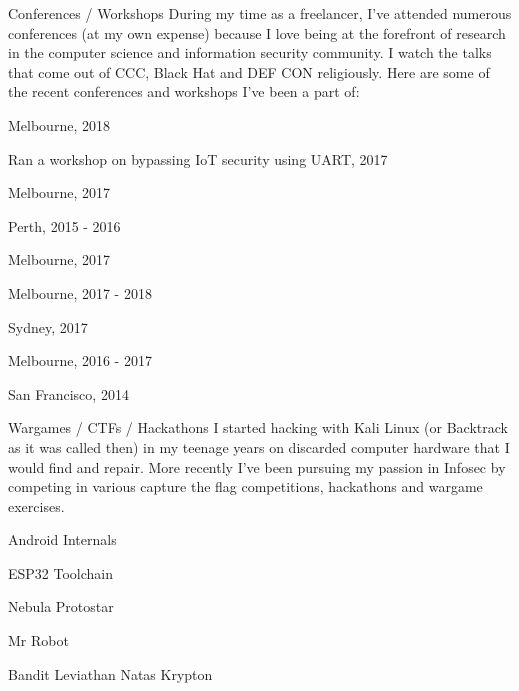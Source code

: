 \begin{cventries}
    \cventrysimple
        {Conferences / Workshops}
        {
            During my time as a freelancer, I've attended numerous conferences (at my own expense) because I love being at the forefront of research in the computer science and information security community. I watch the talks that come out of CCC, Black Hat and DEF CON religiously. Here are some of the recent conferences and workshops I've been a part of:
        }
        {
            \begin{cvitems}
                \item { \acvSubItemSep Melbourne, 2018}
                \item { \acvSubItemSep Ran a workshop on bypassing IoT security using UART, 2017}
                \item { \acvSubItemSep Melbourne, 2017}
                \item { \acvSubItemSep Perth, 2015 - 2016}
                \item { \acvSubItemSep Melbourne, 2017}
                \item { \acvSubItemSep Melbourne, 2017 - 2018}
                \item { \acvSubItemSep Sydney, 2017}
                \item { \acvSubItemSep Melbourne, 2016 - 2017}
                \item { \acvSubItemSep San Francisco, 2014}
            \end{cvitems}
        }


    \cventrysimple
        {Wargames / CTFs / Hackathons}
        {
            I started hacking with Kali Linux (or Backtrack as it was called then) in my teenage years on discarded computer hardware that I would find and repair. More recently I've been pursuing my passion in Infosec by competing in various capture the flag competitions, hackathons and wargame exercises.
        }
        {
            \begin{cvitems}
                \item { }
                \item { \acvSubItemSep Android Internals}
                \item { \acvSubItemSep ESP32 Toolchain}
                \item { \acvSubItemSep Nebula \acvSubItemSep Protostar}
                \item { \acvSubItemSep Mr Robot}
                \item { \acvSubItemSep Bandit \acvSubItemSep Leviathan \acvSubItemSep Natas \acvSubItemSep Krypton}
            \end{cvitems}
        }


\end{cventries}
